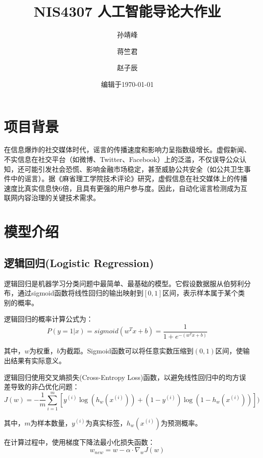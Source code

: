 \documentclass{ctexart}
\title{NIS4307 人工智能导论大作业}
\author{
    孙靖峰\\
    \and
    蒋竺君\\
    \and
    赵子辰
}
\date{编辑于\today}
\begin{document}
\begin{titlepage}
    \maketitle
\end{titlepage}

\newpage

\section{项目背景}

在信息爆炸的社交媒体时代，谣言的传播速度和影响力呈指数级增长。虚假新闻、不实信息在社交平台（如微博、Twitter、Facebook）上的泛滥，不仅误导公众认知，还可能引发社会恐慌、影响金融市场稳定，甚至威胁公共安全（如公共卫生事件中的谣言）。据《麻省理工学院技术评论》研究，虚假信息在社交媒体上的传播速度比真实信息快6倍，且具有更强的用户参与度。因此，自动化谣言检测成为互联网内容治理的关键技术需求。

\section{模型介绍}

\subsection{逻辑回归(Logistic Regression)}

逻辑回归是机器学习分类问题中最简单、最基础的模型。它假设数据服从伯努利分布，通过sigmoid函数将线性回归的输出映射到$[0,1]$区间，表示样本属于某个类别的概率。\par
逻辑回归的概率计算公式为：
\begin{equation}
    P(y=1|x) = sigmoid(w^T x + b) =\frac{1}{1+e^{-(w^T x+b)}}
\end{equation}\par
其中，$w$为权重，$b$为截距。Sigmoid函数可以将任意实数压缩到$(0,1)$区间，使输出结果有实际意义。

逻辑回归使用交叉熵损失(Cross-Entropy Loss)函数，以避免线性回归中的均方误差导致的非凸优化问题：
\begin{equation}
    J(w) = -\frac{1}{m} \sum_{i = 1}^{m} [y^{(i)} \log(h_w (x^{(i)})) + (1-y^{(i)})\log (1-h_w (x^{(i)}))])
\end{equation}\par
其中，$m$为样本数量，$y^{(i)}$为真实标签，$h_w (x^{(i)})$为预测概率。\par
在计算过程中，使用梯度下降法最小化损失函数：
\begin{equation}
    w_{new} = w - \alpha \cdot \nabla_w J(w)
\end{equation}\par
\end{document}
